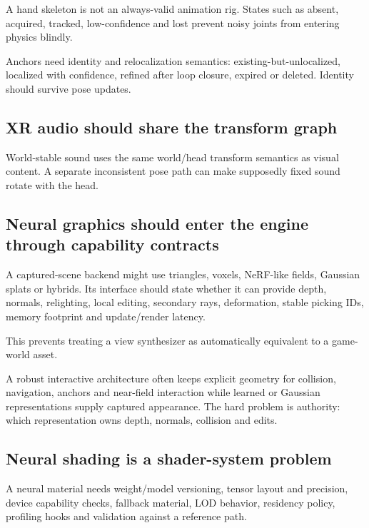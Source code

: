 A hand skeleton is not an always-valid animation rig. States such as absent, acquired, tracked, low-confidence and lost prevent noisy joints from entering physics blindly.

Anchors need identity and relocalization semantics: existing-but-unlocalized, localized with confidence, refined after loop closure, expired or deleted. Identity should survive pose updates.

\subsection{XR audio should share the transform graph}\label{xr-audio-should-share-the-transform-graph}

World-stable sound uses the same world/head transform semantics as visual content. A separate inconsistent pose path can make supposedly fixed sound rotate with the head.

\subsection{Neural graphics should enter the engine through capability contracts}\label{neural-graphics-should-enter-the-engine-through-capability-contracts}

A captured-scene backend might use triangles, voxels, NeRF-like fields, Gaussian splats or hybrids. Its interface should state whether it can provide depth, normals, relighting, local editing, secondary rays, deformation, stable picking IDs, memory footprint and update/render latency.

This prevents treating a view synthesizer as automatically equivalent to a game-world asset.

A robust interactive architecture often keeps explicit geometry for collision, navigation, anchors and near-field interaction while learned or Gaussian representations supply captured appearance. The hard problem is authority: which representation owns depth, normals, collision and edits.

\subsection{Neural shading is a shader-system problem}\label{neural-shading-is-a-shader-system-problem}

A neural material needs weight/model versioning, tensor layout and precision, device capability checks, fallback material, LOD behavior, residency policy, profiling hooks and validation against a reference path.

